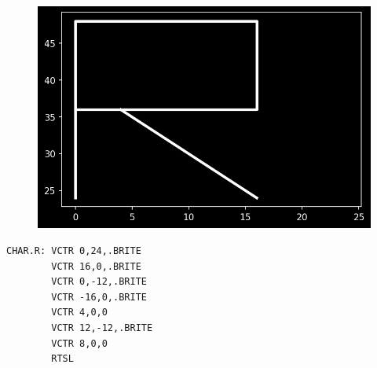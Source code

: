 \begin{minipage}[c]{0.48\linewidth}
\begin{figure}[H]
    \centering
    \begin{adjustbox}{width=4cm,center}
      \includegraphics[width=12cm]{src/literals/R.png}%
    \end{adjustbox}
\end{figure}
\end{minipage}
\begin{minipage}[c]{0.48\linewidth}
\begin{lstlisting}[basicstyle=\scriptsize\ttfamily]
CHAR.R: VCTR 0,24,.BRITE
        VCTR 16,0,.BRITE
        VCTR 0,-12,.BRITE
        VCTR -16,0,.BRITE
        VCTR 4,0,0
        VCTR 12,-12,.BRITE
        VCTR 8,0,0
        RTSL
\end{lstlisting}
\vspace*{\fill}
\end{minipage}

